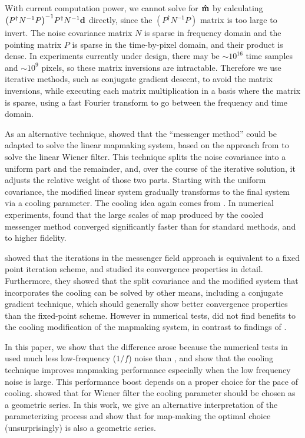 \documentclass[twocolumn,linenumbers]{aastex631}
\newcommand{\vbd}{\vb{d}}
\newcommand{\inv}[1]{#1^{-1}}
\newcommand{\hatm}{\vb{\hat{m}}}
\newcommand{\Pdagger}{P^{\dagger}}
\newcommand{\PPinv}[1]{\inv{\qty(\Pdagger #1 P)}}
\begin{document}
With current computation power, we cannot solve for $\hatm$
by calculating $\PPinv{\inv{N}} \Pdagger \inv{N} \vbd$ directly, since the $(P^\dag \inv{N}P)$ matrix is too large to invert.  The noise covariance matrix $N$ is sparse in frequency domain and the pointing matrix $P$ is sparse in the time-by-pixel domain, and their product is dense.   In experiments currently under design, there may be $\sim 10^{16}$ time samples and $\sim 10^{9}$ pixels, so these matrix inversions are intractable.
Therefore we use iterative methods, such as conjugate gradient descent, to avoid the matrix inversions, while executing each matrix multiplication in a basis where the matrix is sparse, using a fast Fourier transform to go between the frequency and time domain.

As an alternative technique, \citet{Huffenberger_2018} showed that the ``messenger method'' could be adapted to solve the linear mapmaking system, based on the  approach from \cite{2013A&A...549A.111E} to solve the linear Wiener filter.  This technique splits the noise covariance into a uniform part and the remainder, and, over the course of the iterative solution, it adjusts the relative weight of those two parts.  Starting with the uniform covariance, the modified linear system gradually transforms to the final system via a cooling parameter.  The cooling idea again comes from \cite{2013A&A...549A.111E}.  In numerical experiments, \citet{Huffenberger_2018} found that the large scales of map produced by the cooled messenger method converged significantly faster than for standard methods, and to higher fidelity.  

\citet{2018A&A...620A..59P} showed that the iterations in the messenger field approach is equivalent to a fixed point iteration scheme, and studied its convergence properties in detail.  Furthermore, they showed that the split covariance and the modified system that incorporates the cooling can be solved by other means, including a conjugate gradient technique, which should generally show better convergence properties than the fixed-point scheme. However in numerical tests, \citet{2018A&A...620A..59P} did not find benefits to the cooling modification of the mapmaking system, in contrast to findings of \citet{Huffenberger_2018}.

In this paper, we show that the difference arose because the numerical tests in \citet{2018A&A...620A..59P} used much less low-frequency ($1/f$) noise than \citet{Huffenberger_2018}, and show that the cooling technique improves mapmaking performance especially when the low frequency noise is large.  This performance boost depends on a proper choice for the pace of cooling.  \citet{2017MNRAS.468.1782K} showed that for Wiener filter the cooling parameter should be chosen as a geometric series.  In this work, we give an alternative interpretation of the parameterizing process and show that for map-making the optimal choice (unsurprisingly) is also a geometric series.
\end{document}
